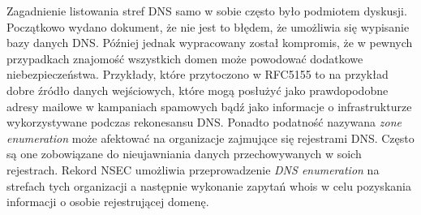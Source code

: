 Zagadnienie listowania stref DNS samo w sobie często było podmiotem dyskusji. Początkowo wydano dokument, że nie jest to błędem, że umożliwia się wypisanie bazy danych DNS\cite{RFC4033}. Później jednak wypracowany został kompromis\cite{RFC5155}, że w pewnych przypadkach znajomość wszystkich domen może powodować dodatkowe niebezpieczeństwa. Przykłady, które przytoczono w RFC5155\cite{RFC5155} to na przykład dobre źródło danych wejściowych, które mogą posłużyć jako prawdopodobne adresy mailowe w kampaniach spamowych bądź jako informacje o infrastrukturze wykorzystywane podczas rekonesansu DNS. Ponadto podatność nazywana \textit{zone enumeration} może afektować na organizacje zajmujące się rejestrami DNS. Często są one zobowiązane do nieujawniania danych przechowywanych w soich rejestrach. Rekord NSEC umożliwia przeprowadzenie \textit{DNS enumeration} na strefach tych organizacji a następnie wykonanie zapytań whois\cite{RFC3912} w celu pozyskania informacji o osobie rejestrującej domenę. 